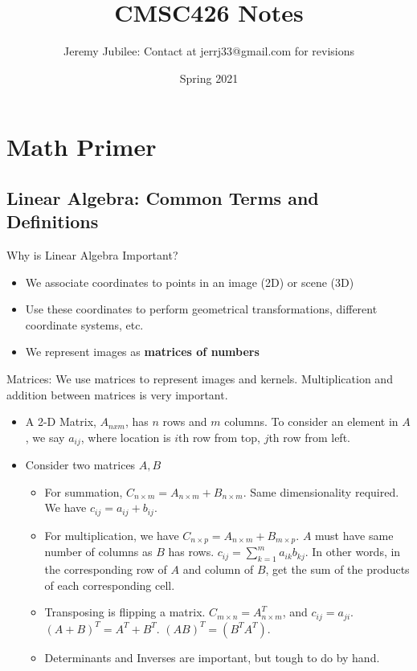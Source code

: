 \documentclass{article}
\title{CMSC426 Notes}
\author{Jeremy Jubilee: Contact at jerrj33@gmail.com for revisions}
\date{Spring 2021}
\begin{document}
\maketitle

\tableofcontents
\newpage

\section{Math Primer}

\subsection{Linear Algebra: Common Terms and Definitions}
Why is Linear Algebra Important?
\begin{itemize}
    \item We associate coordinates to points in an image (2D) or scene (3D)
    \item Use these coordinates to perform geometrical transformations, different coordinate systems, etc.
    \item We represent images as \textbf{matrices of numbers}
\end{itemize}
Matrices: We use matrices to represent images and kernels. Multiplication and addition between matrices is very important. 
\begin{itemize}
    \item A 2-D Matrix, $A_{nxm}$, has $n$ rows and $m$ columns. To consider an element in $A$, we say $a_{ij}$, where location is $i$th row from top, $j$th row from left.
    \item Consider two matrices $A,B$
    \begin{itemize}
        \item For summation, $C_{n\times m} = A_{n\times m} + B_{n\times m}$. Same dimensionality required. We have $c_{ij} = a_{ij} + b_{ij}$.
        \item For multiplication, we have $C_{n\times p} = A_{n\times m} + B_{m\times p}$. $A$ must have same number of columns as $B$ has rows. $c_{ij} = \sum^m_{k=1}a_{ik}b_{kj}$. In other words, in the corresponding row of $A$ and column of $B$, get the sum of the products of each corresponding cell.
        \item Transposing is flipping a matrix. $C_{m\times n} = A^T_{n\times m}$, and $c_{ij} = a_{ji}$. $(A+B)^T = A^T + B^T$. $(AB)^T = (B^TA^T)$.
        \item Determinants and Inverses are important, but tough to do by hand.
    \end{itemize}
\end{itemize}
\end{document}
